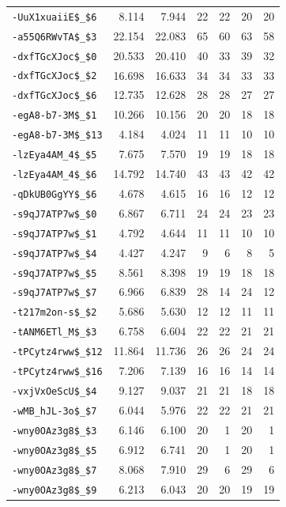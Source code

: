 \begin{longtable}{lrrrrrr}
\nolinkurl{-UuX1xuaiiE$_$6} & 8.114 & 7.944 & 22 & 22 & 20 & 20\\
\nolinkurl{-a55Q6RWvTA$_$3} & 22.154 & 22.083 & 65 & 60 & 63 & 58\\
\nolinkurl{-dxfTGcXJoc$_$0} & 20.533 & 20.410 & 40 & 33 & 39 & 32\\
\nolinkurl{-dxfTGcXJoc$_$2} & 16.698 & 16.633 & 34 & 34 & 33 & 33\\
\nolinkurl{-dxfTGcXJoc$_$6} & 12.735 & 12.628 & 28 & 28 & 27 & 27\\
\nolinkurl{-egA8-b7-3M$_$1} & 10.266 & 10.156 & 20 & 20 & 18 & 18\\
\nolinkurl{-egA8-b7-3M$_$13} & 4.184 & 4.024 & 11 & 11 & 10 & 10\\
\nolinkurl{-lzEya4AM_4$_$5} & 7.675 & 7.570 & 19 & 19 & 18 & 18\\
\nolinkurl{-lzEya4AM_4$_$6} & 14.792 & 14.740 & 43 & 43 & 42 & 42\\
\nolinkurl{-qDkUB0GgYY$_$6} & 4.678 & 4.615 & 16 & 16 & 12 & 12\\
\nolinkurl{-s9qJ7ATP7w$_$0} & 6.867 & 6.711 & 24 & 24 & 23 & 23\\
\nolinkurl{-s9qJ7ATP7w$_$1} & 4.792 & 4.644 & 11 & 11 & 10 & 10\\
\nolinkurl{-s9qJ7ATP7w$_$4} & 4.427 & 4.247 & 9 & 6 & 8 & 5\\
\nolinkurl{-s9qJ7ATP7w$_$5} & 8.561 & 8.398 & 19 & 19 & 18 & 18\\
\nolinkurl{-s9qJ7ATP7w$_$7} & 6.966 & 6.839 & 28 & 14 & 24 & 12\\
\nolinkurl{-t217m2on-s$_$2} & 5.686 & 5.630 & 12 & 12 & 11 & 11\\
\nolinkurl{-tANM6ETl_M$_$3} & 6.758 & 6.604 & 22 & 22 & 21 & 21\\
\nolinkurl{-tPCytz4rww$_$12} & 11.864 & 11.736 & 26 & 26 & 24 & 24\\
\nolinkurl{-tPCytz4rww$_$16} & 7.206 & 7.139 & 16 & 16 & 14 & 14\\
\nolinkurl{-vxjVxOeScU$_$4} & 9.127 & 9.037 & 21 & 21 & 18 & 18\\
\nolinkurl{-wMB_hJL-3o$_$7} & 6.044 & 5.976 & 22 & 22 & 21 & 21\\
\nolinkurl{-wny0OAz3g8$_$3} & 6.146 & 6.100 & 20 & 1 & 20 & 1\\
\nolinkurl{-wny0OAz3g8$_$5} & 6.912 & 6.741 & 20 & 1 & 20 & 1\\
\nolinkurl{-wny0OAz3g8$_$7} & 8.068 & 7.910 & 29 & 6 & 29 & 6\\
\nolinkurl{-wny0OAz3g8$_$9} & 6.213 & 6.043 & 20 & 20 & 19 & 19\\

\end{longtable}
